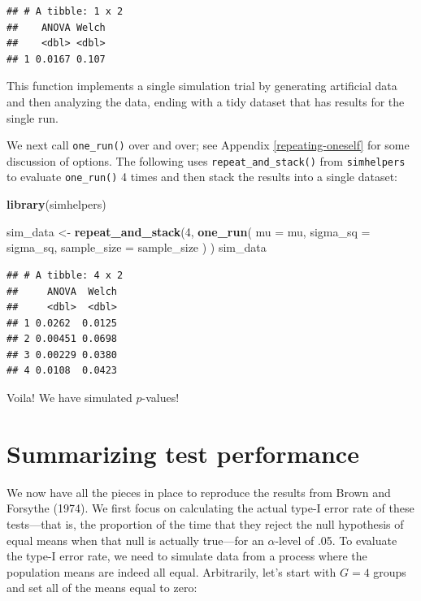 \documentclass[
]{book}
\newenvironment{Shaded}{\begin{snugshade}}{\end{snugshade}}
\newcommand{\AttributeTok}[1]{\textcolor[rgb]{0.13,0.29,0.53}{#1}}
\newcommand{\DecValTok}[1]{\textcolor[rgb]{0.00,0.00,0.81}{#1}}
\newcommand{\FunctionTok}[1]{\textcolor[rgb]{0.13,0.29,0.53}{\textbf{#1}}}
\newcommand{\NormalTok}[1]{#1}
\newcommand{\OtherTok}[1]{\textcolor[rgb]{0.56,0.35,0.01}{#1}}
\begin{document}
\begin{verbatim}
## # A tibble: 1 x 2
##    ANOVA Welch
##    <dbl> <dbl>
## 1 0.0167 0.107
\end{verbatim}

This function implements a single simulation trial by generating artificial data and then analyzing the data, ending with a tidy dataset that has results for the single run.

We next call \texttt{one\_run()} over and over; see Appendix \ref{repeating-oneself} for some discussion of options.
The following uses \texttt{repeat\_and\_stack()} from \texttt{simhelpers} to evaluate \texttt{one\_run()} 4 times and then stack the results into a single dataset:

\begin{Shaded}
\begin{Highlighting}[]
\FunctionTok{library}\NormalTok{(simhelpers)}

\NormalTok{sim\_data }\OtherTok{\textless{}{-}} \FunctionTok{repeat\_and\_stack}\NormalTok{(}\DecValTok{4}\NormalTok{, }
  \FunctionTok{one\_run}\NormalTok{(}
    \AttributeTok{mu =}\NormalTok{ mu, }
    \AttributeTok{sigma\_sq =}\NormalTok{ sigma\_sq, }
    \AttributeTok{sample\_size =}\NormalTok{ sample\_size}
\NormalTok{  )}
\NormalTok{)}
\NormalTok{sim\_data}
\end{Highlighting}
\end{Shaded}

\begin{verbatim}
## # A tibble: 4 x 2
##     ANOVA  Welch
##     <dbl>  <dbl>
## 1 0.0262  0.0125
## 2 0.00451 0.0698
## 3 0.00229 0.0380
## 4 0.0108  0.0423
\end{verbatim}

Voila! We have simulated \(p\)-values!

\section{Summarizing test performance}\label{summarizing-test-performance}

We now have all the pieces in place to reproduce the results from Brown and Forsythe (1974).
We first focus on calculating the actual type-I error rate of these tests---that is, the proportion of the time that they reject the null hypothesis of equal means when that null is actually true---for an \(\alpha\)-level of .05.
To evaluate the type-I error rate, we need to simulate data from a process where the population means are indeed all equal.
Arbitrarily, let's start with \(G = 4\) groups and set all of the means equal to zero:
\end{document}
